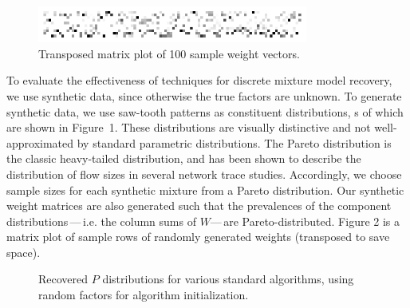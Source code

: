 \documentclass[conference]{IEEEtran}
\begin{document}
\begin{figure}[b]
\begin{center}
\includegraphics[width=3.5in]{synth/weights}
\end{center}
\vspace{-0.7em}
\caption{Transposed matrix plot of 100 sample weight vectors.}
\vspace{-0.5em}
\end{figure}

To evaluate the effectiveness of  techniques for discrete mixture model recovery, we use synthetic data, since otherwise the true factors are unknown.
To generate synthetic data, we use saw-tooth patterns as constituent distributions, s of which are shown in Figure~1.
These distributions are visually distinctive and not well-approximated by standard parametric distributions.
The Pareto distribution is the classic heavy-tailed distribution, and has been shown to describe the distribution of flow sizes in several network trace studies.
Accordingly, we choose sample sizes for each synthetic mixture from a Pareto distribution.
Our synthetic weight matrices are also generated such that the prevalences of the component distributions\,---\,i.e. the column sums of $W$---\,are Pareto-distributed. Figure 2 is a matrix plot of sample rows of randomly generated weights (transposed to save space).

\begin{figure}[t]
\begin{center}
\end{center}
\caption{Recovered $P$ distributions for various standard  algorithms, using random factors for algorithm initialization.}
\end{figure}
\end{document}
